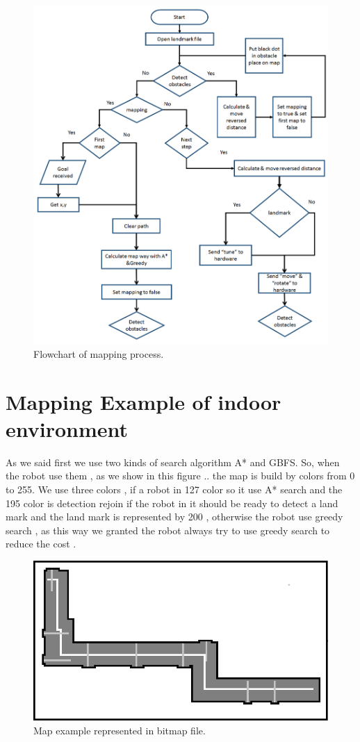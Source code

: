 \documentclass[12pt]{book}
\begin{document}
\begin{figure}
	\centering
	\includegraphics[width =1\textwidth]{Fig/mapping-flowchart.png}
	\caption{Flowchart of mapping process.}
	\label{fig:map-flowchart}
\end{figure}

\section{Mapping Example of indoor environment}
As we said first we use two kinds of search algorithm A* and GBFS. So, when the robot use them , as we show in this figure .. the map is build by colors from 0 to 255. 
We use three colors  , if a robot in 127 color so it use A* search and the 195 color is detection rejoin if the robot in it  should be ready to detect a land mark and the land mark is represented by 200 , otherwise the robot use greedy search , as this way we granted the robot always try to use greedy search to reduce the cost .

\begin{figure}
	\centering
	\includegraphics[width =.5\textwidth]{Fig/map-example.png}
	\caption{Map example represented in bitmap file.}
	\label{fig:map-example}
\end{figure}
\end{document}
